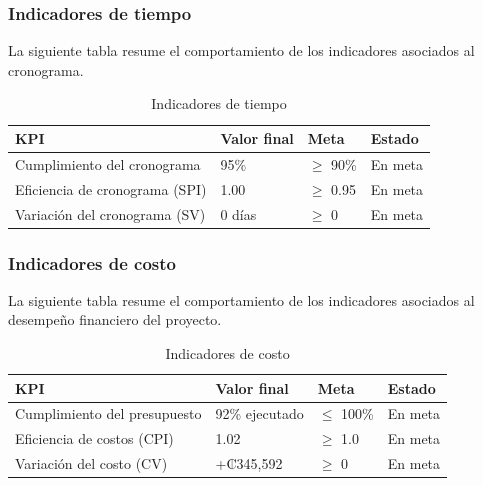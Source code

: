 \documentclass[11pt,spanish]{article}
\begin{document}
\subsubsection{Indicadores de tiempo}

La siguiente tabla resume el comportamiento de los indicadores asociados al
cronograma.

\begin{table}[H]
\centering
\caption{Indicadores de tiempo}
\label{tab:kpi-tiempo}
\begin{tabularx}{\textwidth}{Yp{3cm}p{2.5cm}p{2.5cm}}
\toprule
\textbf{KPI} &
\textbf{Valor final} &
\textbf{Meta} &
\textbf{Estado} \\
\midrule

Cumplimiento del cronograma &
95\% &
$\geq$ 90\% &
En meta
\\

Eficiencia de cronograma (SPI) &
1.00 &
$\geq$ 0.95 &
En meta
\\

Variación del cronograma (SV) &
0 días &
$\geq$ 0 &
En meta
\\

\bottomrule
\end{tabularx}
\end{table}

\subsubsection{Indicadores de costo}

La siguiente tabla resume el comportamiento de los indicadores asociados al
desempeño financiero del proyecto.

\begin{table}[H]
\centering
\caption{Indicadores de costo}
\label{tab:kpi-costo}
\begin{tabularx}{\textwidth}{Yp{3cm}p{2.5cm}p{2.5cm}}
\toprule
\textbf{KPI} &
\textbf{Valor final} &
\textbf{Meta} &
\textbf{Estado} \\
\midrule

Cumplimiento del presupuesto &
92\% ejecutado &
$\leq$ 100\% &
En meta
\\

Eficiencia de costos (CPI) &
1.02 &
$\geq$ 1.0 &
En meta
\\

Variación del costo (CV) &
+₡345,592 &
$\geq$ 0 &
En meta
\\

\bottomrule
\end{tabularx}
\end{table}
\end{document}
